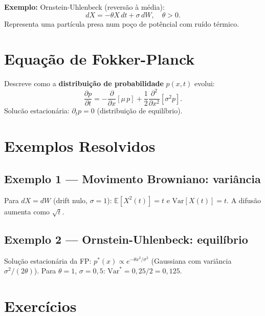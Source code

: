 \documentclass[12pt,a4paper]{article}
\begin{document}
\textbf{Exemplo:} Ornstein-Uhlenbeck (revers\~ao \`a m\'edia):
\[
dX = -\theta X\,dt + \sigma\,dW, \quad \theta > 0.
\]
Representa uma part\'icula presa num po\c{c}o de pot\^encial com ru\'ido t\'ermico.

\section*{Equa\c{c}\~ao de Fokker-Planck}

Descreve como a \textbf{distribui\c{c}\~ao de probabilidade} $p(x,t)$ evolui:
\[
\frac{\partial p}{\partial t} = -\frac{\partial}{\partial x}[\mu\, p] + \frac{1}{2}\frac{\partial^2}{\partial x^2}[\sigma^2 p].
\]
Soluc\~ao estacion\'aria: $\partial_t p = 0$ (distribui\c{c}\~ao de equil\'ibrio).

\section*{Exemplos Resolvidos}

\subsection*{Exemplo 1 --- Movimento Browniano: vari\^ancia}
Para $dX = dW$ (drift nulo, $\sigma=1$): $\mathbb{E}[X^2(t)] = t$ e $\text{Var}[X(t)] = t$.
A difus\~ao aumenta como $\sqrt{t}$.

\subsection*{Exemplo 2 --- Ornstein-Uhlenbeck: equil\'ibrio}
Solu\c{c}\~ao estacion\'aria da FP: $p^*(x) \propto e^{-\theta x^2/\sigma^2}$ (Gaussiana com vari\^ancia $\sigma^2/(2\theta)$).
Para $\theta=1$, $\sigma=0{,}5$: $\text{Var}^* = 0{,}25/2 = 0{,}125$.

\section*{Exerc\'icios}
\end{document}
